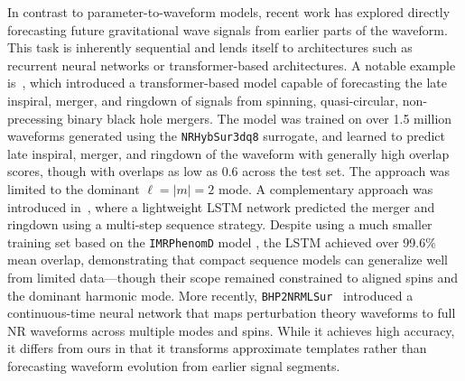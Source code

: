 \documentclass[12pt]{iopart}
\begin{document}
In contrast to parameter-to-waveform models, recent work has explored directly forecasting future gravitational wave signals from earlier parts of the waveform. This task is inherently sequential and lends itself to architectures such as recurrent neural networks or transformer-based architectures. A notable example is~\cite{khan_huerta_forecast}, which introduced a transformer-based model capable of forecasting the late inspiral, merger, and ringdown of signals from spinning, quasi-circular, non-precessing binary black hole mergers. The model was trained on over 1.5 million waveforms generated using the \texttt{NRHybSur3dq8} surrogate\cite{2019PhRvD99f4045V}, and learned to predict late inspiral, merger, and ringdown of the waveform with generally high overlap scores, though with overlaps as low as 0.6 across the test set. The approach was limited to the dominant $\ell=|m|=2$ mode. 
A complementary approach was introduced in~\cite{luo2024multistep}, where a lightweight LSTM network predicted the merger and ringdown using a multi-step sequence strategy. Despite using a much smaller training set based on the \texttt{IMRPhenomD} model \cite{2023ascl.soft07019P}, the LSTM \cite{10.1162/neco.1997.9.8.1735} achieved over 99.6$\%$ mean overlap, demonstrating that compact sequence models can generalize well from limited data—though their scope remained constrained to aligned spins and the dominant harmonic mode. 
More recently, \texttt{BHP2NRMLSur}~\cite{Zhong:2025dwo} introduced a continuous-time neural network that maps perturbation theory waveforms to full NR waveforms across multiple modes and spins. While it achieves high accuracy, it differs from ours in that it transforms approximate templates rather than forecasting waveform evolution from earlier signal segments.
\end{document}
